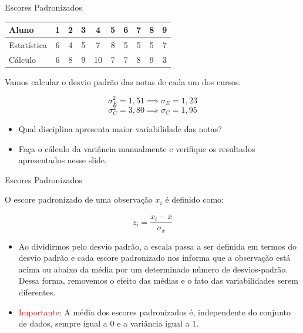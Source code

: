 \begin{frame}{Escores Padronizados}
    \centering
    \begin{tabular}{lccccccccc}
    \toprule
    Aluno & 1 & 2 & 3 & 4 & 5 & 6 & 7 & 8 & 9 \\
    \midrule
    Estatística & 6 & 4 & 5 & 7 & 8 & 5 & 5 & 5 & 7 \\
    Cálculo     & 6 & 8 & 9 & 10 & 7 & 7 & 8 & 9 & 3 \\
    \bottomrule
    \end{tabular}

    Vamos calcular o desvio padrão das notas de cada um dos cursos. 

    $$\sigma^2_{E} = 1,51 \implies \sigma_{E} = 1,23$$
    \pause
    $$\sigma^2_{C} = 3,80 \implies \sigma_{C} = 1,95$$

    \pause
    \begin{itemize}
        \item Qual disciplina apresenta maior variabilidade das notas?
        \pause
        \item Faça o cálculo da variância manualmente e verifique os resultados apresentados nesse slide. 
    \end{itemize}
\end{frame}

\begin{frame}{Escores Padronizados}

    O escore padronizado de uma observação $x_i$ é definido como:

    $$z_i = \dfrac{x_i - \bar{x}}{\sigma_x}$$

    \pause

    \begin{itemize}
        \item Ao dividirmos pelo desvio padrão, a escala passa a ser definida em termos do desvio padrão e cada escore padronizado nos informa que a observação está 
        acima ou abaixo da média por um determinado número de desvios-padrão. Dessa forma, removemos o efeito das médias e o fato das variabilidades serem diferentes. 
        \item \textcolor{red}{Importante}: A média dos escores padronizados é, independente do conjunto de dados, sempre igual a $0$ e a variância igual a $1$.
    \end{itemize}
\end{frame}

